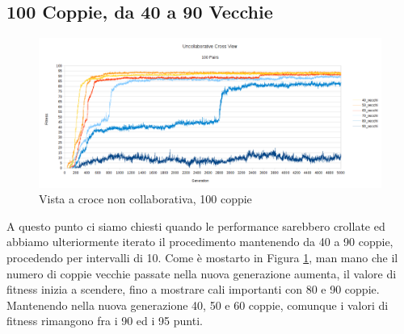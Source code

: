 \subsection{100 Coppie, da 40 a 90 Vecchie}
\begin{figure}[ht]
	\centering
	\includegraphics[scale=0.7,angle=90]{imgs/cross_nc_100_pairs_40_90_old.png}
	\caption{Vista a croce non collaborativa, 100 coppie}
	\label{figure:cross_nc_100_40_90}
\end{figure}
A questo punto ci siamo chiesti quando le performance sarebbero crollate ed
abbiamo ulteriormente iterato il procedimento mantenendo da 40 a 90 coppie,
procedendo per intervalli di 10. Come è mostarto in Figura
\ref{figure:cross_nc_100_40_90}, man mano che il numero di coppie vecchie
passate nella nuova generazione aumenta, il valore di fitness inizia a scendere,
fino a mostrare cali importanti con 80 e 90 coppie. Mantenendo nella nuova
generazione 40, 50 e 60 coppie, comunque i valori di fitness rimangono fra i 90
ed i 95 punti.

\clearpage

